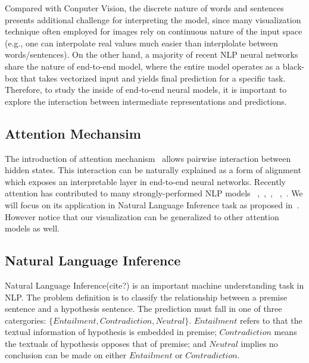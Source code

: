 

Compared with Conputer Vision, the discrete nature of words and sentences
presents additional challenge for
interpreting the model, since many visualization technique often employed
for images rely on continuous nature of the input space (e.g., one can interpolate
real values much easier than interplolate between words/sentences).
%
On the other hand, a majority of recent NLP neural networks share the nature of
end-to-end model, where the entire model operates as a black-box that takes
vectorized input and yields final prediction for a specific task.
Therefore, to study the inside of end-to-end neural models, it is important to
explore the interaction between intermediate representations and predictions.

\subsection{Attention Mechansim}
\label{sec:attention}
The introduction of attention mechanism~\cite{bahdanau2014neural} allows
pairwise interaction between hidden states. This interaction can be naturally explained
as a form of alignment which exposes an interpretable layer in end-to-end neural networks.
Recently attention has contributed to many strongly-performed NLP models
~\cite{parikh2016emnlp},~\cite{rush2015neural},~\cite{yang2016hierarchical},
~\cite{seo2016bidirectional},~\cite{schwartz2017high}.
We will focus on its application in Natural Language Inference task as proposed in~\cite{parikh2016emnlp}.
However notice that our visualization can be generalized to other attention models as well.

\subsection{Natural Language Inference}
\label{sec:languageInference}
Natural Language Inference(cite?) is an important machine understanding task in NLP.
The problem definition is to classify the relationship between a premise sentence and a hypothesis sentence.
The prediction must fall in one of three catergories: $\{Entailment, Contradiction, Neutral\}$.
$Entailment$ refers to that the textual information of hypothesis is embedded in premise;
$Contradiction$ means the textuals of hypothesis opposes that of premise;
and $Neutral$ implies no conclusion can be made on either $Entailment$ or $Contradiction$.

